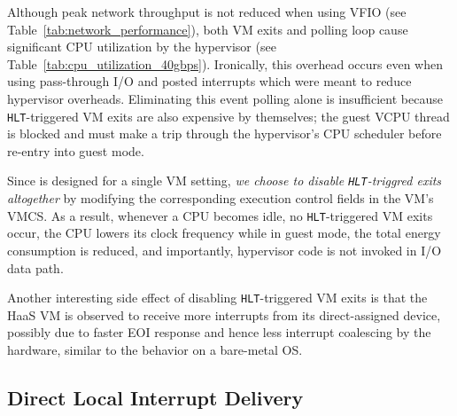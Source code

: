 Although peak network throughput is not reduced when 
using VFIO (see Table~\ref{tab:network_performance}), 
both VM exits and polling loop cause significant 
CPU utilization by the hypervisor 
(see Table~\ref{tab:cpu_utilization_40gbps}).
Ironically, this overhead occurs even when using pass-through I/O and 
posted interrupts which were meant to reduce hypervisor overheads.
Eliminating this event polling alone is insufficient because {\tt HLT}-triggered VM exits 
are also expensive by themselves; the guest VCPU thread is blocked and
must make a trip through the hypervisor's CPU scheduler before 
re-entry into guest mode.

Since \na is designed for a single VM setting, {\em we choose to
disable {\tt HLT}-triggred exits altogether}
by modifying the corresponding execution control fields in the VM's VMCS.
As a result, whenever a CPU becomes idle, no {\tt HLT}-triggered
VM exits occur, the CPU lowers its clock frequency while in guest mode, 
the total energy consumption is reduced, and importantly, 
hypervisor code is not invoked in I/O data path. 

Another interesting side effect of disabling {\tt HLT}-triggered VM exits
is that the HaaS VM is observed to receive more interrupts
from its direct-assigned device, possibly due to 
faster EOI response and hence less interrupt coalescing by 
the hardware, similar to the behavior on a bare-metal OS.

%
%


\subsection{Direct Local Interrupt Delivery} 
\label{subsubsec:shared_pid_dtid}


